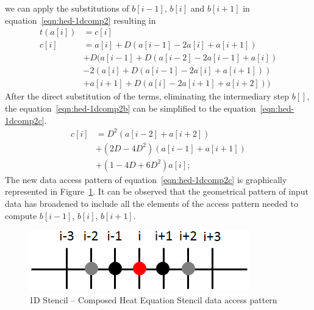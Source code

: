 \documentclass{acm_proc_article-sp}
\begin{document}

we can apply the substitutions of $b[i-1]$, $b[i]$ and $b[i+1]$ in equation~\eqref{eqn:hed-1dcomp2} resulting in
\begin{equation}
  \begin{split}
    t(a[i]) &= c[i]\\
    c[i] &= a[i] + D(a[i-1] - 2a[i] + a[i+1])\\
    &+ D(a[i-1] + D(a[i-2] - 2a[i-1] + a[i])\\
    &- 2(a[i] + D(a[i-1] - 2a[i] + a[i+1]))\\
    &+ a[i+1] + D(a[i] - 2a[i+1] + a[i+2]))
  \end{split}
  \label{eqn:hed-1dcomp2b}
\end{equation}
After the direct substitution of the terms, eliminating the intermediary step $b[]$, the equation~\eqref{eqn:hed-1dcomp2b} can be simplified to the equation~\eqref{eqn:hed-1dcomp2c}.
\begin{equation}
  \begin{split}
    c[i] &= D^2(a[i-2]+a[i+2])\\
       &+ (2D-4D^2)(a[i-1]+a[i+1])\\ 
       &+ (1-4D+6D^2)a[i];
  \end{split}
  \label{eqn:hed-1dcomp2c}
\end{equation}
The new data access pattern of equation~\eqref{eqn:hed-1dcomp2c} is graphically represented in Figure~\ref{pic:1d-s02}. It can be observed that the geometrical pattern of input data has broadened to include all the elements of the access pattern needed to compute $b[i-1]$, $b[i]$, $b[i+1]$. 
\begin{figure}[ht!]
  \centering
  \includegraphics[scale=0.5]{pics/stencil_grid/1d-s02}
  \caption{1D Stencil -- Composed Heat Equation Stencil data access pattern}
  \label{pic:1d-s02}
\end{figure}
\end{document}

